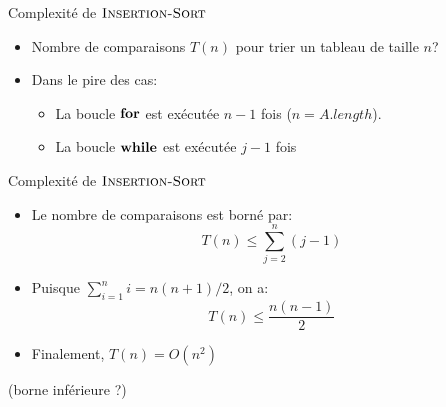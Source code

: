 \begin{frame}{Complexité de $\textnormal{\scshape Insertion-Sort}$}
\begin{center}
\end{center}

\bigskip

\begin{itemize}
\item Nombre de comparaisons $T(n)$ pour trier un tableau de taille $n$?
\item Dans le pire des cas:
\begin{itemize}
\item La boucle $\textbf{for}$ est exécutée $n-1$ fois ($n=A.length$).
\item La boucle $\textbf{while}$ est exécutée $j-1$ fois
\end{itemize}
\end{itemize}

\end{frame}

\begin{frame}{Complexité de $\textnormal{\scshape Insertion-Sort}$}

\begin{itemize}
\item Le nombre de comparaisons est borné par:
$$T(n)\leq \sum_{j=2}^n (j-1)$$
\item Puisque $\sum_{i=1}^n i=n(n+1)/2$, on a:
$$T(n)\leq\frac{n(n-1)}{2}$$
\item Finalement, $T(n)=O(n^2)$
\end{itemize}

\bigskip

(borne inférieure ?)

\end{frame}



